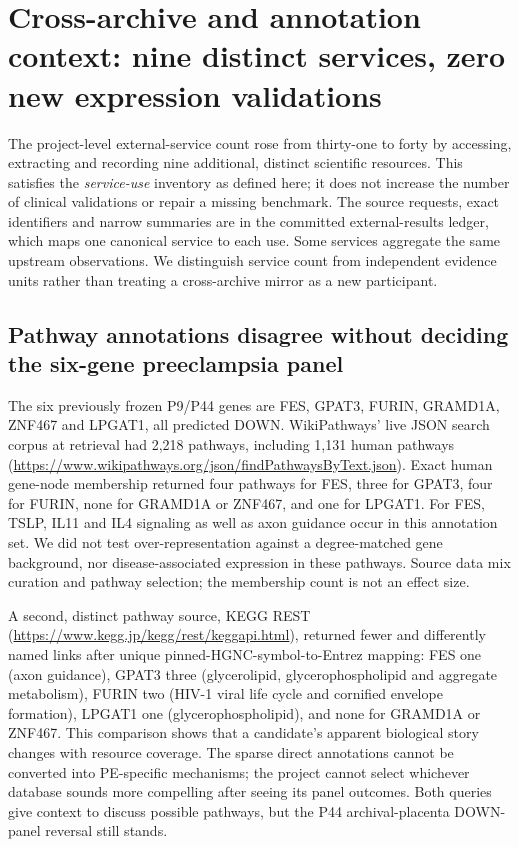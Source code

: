\documentclass[11pt,a4paper]{article}
\begin{document}
\section{Cross-archive and annotation context: nine distinct services, zero new expression validations}
The project-level external-service count rose from thirty-one to forty by accessing, extracting and recording nine additional, distinct scientific resources. This satisfies the \emph{service-use} inventory as defined here; it does not increase the number of clinical validations or repair a missing benchmark. The source requests, exact identifiers and narrow summaries are in the committed external-results ledger, which maps one canonical service to each use. Some services aggregate the same upstream observations. We distinguish service count from independent evidence units rather than treating a cross-archive mirror as a new participant.

\subsection{Pathway annotations disagree without deciding the six-gene preeclampsia panel}
The six previously frozen P9/P44 genes are FES, GPAT3, FURIN, GRAMD1A, ZNF467 and LPGAT1, all predicted DOWN. WikiPathways' live JSON search corpus at retrieval had 2,218 pathways, including 1,131 human pathways (\url{https://www.wikipathways.org/json/findPathwaysByText.json}). Exact human gene-node membership returned four pathways for FES, three for GPAT3, four for FURIN, none for GRAMD1A or ZNF467, and one for LPGAT1. For FES, TSLP, IL11 and IL4 signaling as well as axon guidance occur in this annotation set. We did not test over-representation against a degree-matched gene background, nor disease-associated expression in these pathways. Source data mix curation and pathway selection; the membership count is not an effect size.

A second, distinct pathway source, KEGG REST (\url{https://www.kegg.jp/kegg/rest/keggapi.html}), returned fewer and differently named links after unique pinned-HGNC-symbol-to-Entrez mapping: FES one (axon guidance), GPAT3 three (glycerolipid, glycerophospholipid and aggregate metabolism), FURIN two (HIV-1 viral life cycle and cornified envelope formation), LPGAT1 one (glycerophospholipid), and none for GRAMD1A or ZNF467. This comparison shows that a candidate's apparent biological story changes with resource coverage. The sparse direct annotations cannot be converted into PE-specific mechanisms; the project cannot select whichever database sounds more compelling after seeing its panel outcomes. Both queries give context to discuss possible pathways, but the P44 archival-placenta DOWN-panel reversal still stands.
\end{document}
